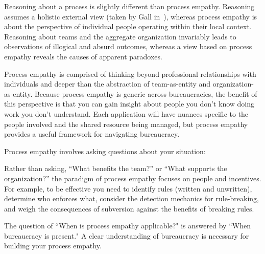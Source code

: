 Reasoning about a process is slightly different than process empathy. Reasoning assumes a holistic external view (taken by Gall in~\cite{2002_Gall}), whereas process empathy is about the perspective of individual people operating within their local context. Reasoning about teams and the aggregate organization invariably leads to observations of illogical and absurd outcomes, whereas a view based on process empathy reveals the causes of apparent paradoxes.

Process empathy is comprised of thinking beyond professional relationships with individuals and deeper than the abstraction of team-as-entity and organization-as-entity. 
Because process empathy is generic across bureaucracies, the benefit of this perspective is that you can gain insight about people you don't know doing work you don't understand.
Each application will have nuances specific to the people involved and the shared resource being managed, but process empathy provides a useful framework for navigating bureaucracy.


Process empathy involves asking questions about your situation:

Rather than asking, ``What benefits the team?'' or ``What supports the organization?'' the paradigm of process empathy focuses on people and incentives. %
For example, to be effective you need to 
identify rules (written and unwritten), determine who enforces what, consider the detection mechanics for rule-breaking, and weigh the consequences of subversion against the benefits of breaking rules.


The question of ``When is process empathy applicable?" is answered by ``When bureaucracy is present." A clear understanding of bureaucracy is necessary for building your process empathy.
